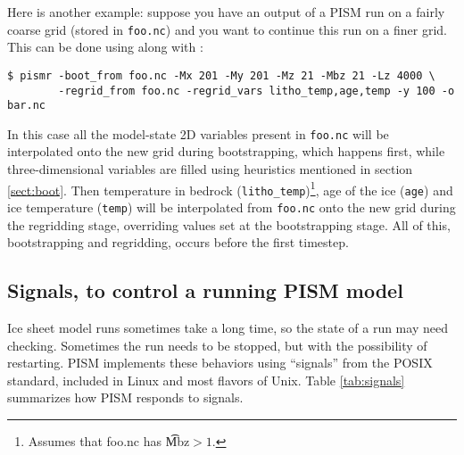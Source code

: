 Here is another example: suppose you have an output of a PISM run on a fairly coarse grid (stored in \verb|foo.nc|) and you want to continue this run on a finer grid. This can be done using  along with :
\begin{verbatim}
$ pismr -boot_from foo.nc -Mx 201 -My 201 -Mz 21 -Mbz 21 -Lz 4000 \
        -regrid_from foo.nc -regrid_vars litho_temp,age,temp -y 100 -o bar.nc
\end{verbatim}
In this case all the model-state 2D variables present in \verb|foo.nc| will be interpolated onto the new grid during bootstrapping, which happens first, while three-dimensional variables are filled using heuristics mentioned in section \ref{sect:boot}.  Then temperature in bedrock (\verb|litho_temp|)\footnote{Assumes that foo.nc has \t{Mbz}$>1$.}, age of the ice (\verb|age|) and ice temperature (\verb|temp|) will be interpolated from \verb|foo.nc| onto the new grid during the regridding stage, overriding values set at the bootstrapping stage.  All of this, bootstrapping and regridding, occurs before the first timestep.


\subsection{Signals, to control a running PISM model} \label{subsect:signal}    Ice sheet model runs sometimes take a long time, so the state of a run may need checking.  Sometimes the run needs to be stopped, but with the possibility of restarting.  PISM implements these behaviors using ``signals'' from the POSIX standard, included in Linux and most flavors of Unix.  Table \ref{tab:signals} summarizes how PISM responds to signals.


